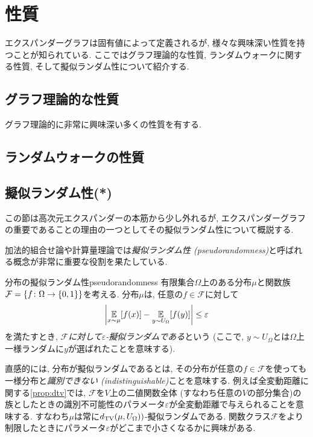 \section{性質}
エクスパンダーグラフは固有値によって定義されるが, 様々な興味深い性質を持つことが知られている.
ここではグラフ理論的な性質, ランダムウォークに関する性質, そして擬似ランダム性について紹介する.
%
\subsection{グラフ理論的な性質}
グラフ理論的に非常に興味深い多くの性質を有する.

\subsection{ランダムウォークの性質}

\subsection{擬似ランダム性(*)} \label{sec:expander pseudorandom}
この節は高次元エクスパンダーの本筋から少し外れるが,
エクスパンダーグラフの重要であることの理由の一つとしてその擬似ランダム性について概説する.

加法的組合せ論や計算量理論では\emph{擬似ランダム性 (pseudorandomness)}と呼ばれる概念が非常に重要な役割を果たしている.
\begin{definition}{分布の擬似ランダム性}{pseudorandomness}
    有限集合$\Omega$上のある分布$\mu$と関数族$\mathcal{F}=\{f\colon \Omega \to \{0,1\}\}$を考える.
    分布$\mu$は,
    任意の$f\in \mathcal{F}$に対して
    \[ \left\lvert\operatorname*{\mathbb{E}}_{x\sim \mu} [f(x)] - \operatorname*{\mathbb{E}}_{y\sim U_{\Omega}}[f(y)]\right\rvert \le \varepsilon\]
    を満たすとき, \emph{$\mathcal{F}$に対して$\varepsilon$-擬似ランダムである}という (ここで, $y\sim U_\Omega$とは$\Omega$上一様ランダムに$y$が選ばれたことを意味する).
\end{definition}
直感的には, 分布が擬似ランダムであるとは, その分布が任意の$f\in \mathcal{F}$を使っても一様分布と\emph{識別できない (indistinguishable)}ことを意味する.
例えば全変動距離に関する\cref{prop:dtv}では, $\mathcal{F}$を$V$上の二値関数全体 (すなわち任意の$V$の部分集合)の族としたときの識別不可能性のパラメータ$\varepsilon$が全変動距離で与えられることを意味する.
すなわち$\mu$は常に$d_{\mathrm{TV}}(\mu,U_{\Omega}))$-擬似ランダムである.
関数クラス$\mathcal{F}$をより制限したときにパラメータ$\varepsilon$がどこまで小さくなるかに興味がある.

